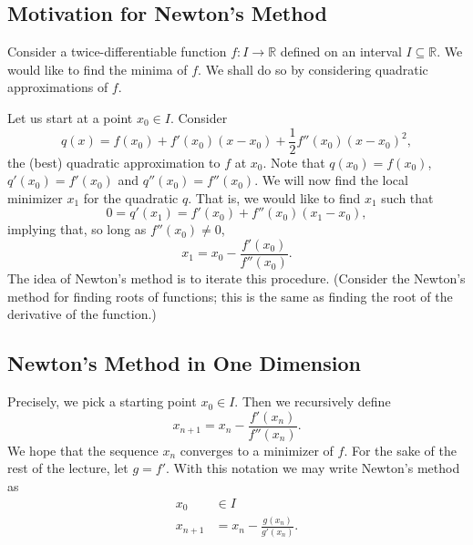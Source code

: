 \documentclass[11pt]{article}
\newcommand{\R}{\mathbb{R}}
\begin{document}
\subsection{Motivation for Newton's Method}

Consider a twice-differentiable function $f : I \to \R$ defined on an interval $I \subseteq \R$. We would like to find the minima of $f$. We shall do so by considering quadratic approximations of $f$. 

Let us start at a point $x_0 \in I$. Consider 
\[
q(x) = f(x_0) + f'(x_0)(x - x_0) + \frac{1}{2}f''(x_0)(x-x_0)^2,
\]
the (best) quadratic approximation to $f$ at $x_0$. Note that $q(x_0) = f(x_0)$, $q'(x_0) = f'(x_0)$ and $q''(x_0) = f''(x_0)$. We will now find the local minimizer $x_1$ for the quadratic $q$. That is, we would like to find $x_1$ such that
\[
0 = q'(x_1) = f'(x_0) + f''(x_0)(x_1-x_0),
\]
implying that, so long as $f''(x_0) \neq 0$, 
\[
x_1 = x_0 - \frac{f'(x_0)}{f''(x_0)}.
\]
The idea of Newton's method is to iterate this procedure. (Consider the Newton's method for finding roots of functions; this is the same as finding the root of the derivative of the function.)

\subsection{Newton's Method in One Dimension}

Precisely, we pick a starting point $x_0 \in I$. Then we recursively define
\[
x_{n+1} = x_n - \frac{f'(x_n)}{f''(x_n)}.
\]
We hope that the sequence $x_n$ converges to a minimizer of $f$. For the sake of the rest of the lecture, let $g = f'$. With this notation we may write Newton's method as
\begin{align*}
x_0 &\in I \\
x_{n+1} &= x_n - \frac{g(x_n)}{g'(x_n)}.
\end{align*}
\end{document}
